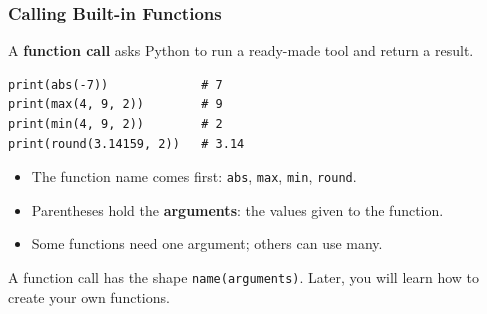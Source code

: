 \documentclass[aspectratio=169,10pt]{beamer}
\newcommand{\keyword}[1]{\textcolor{PrimaryBlue}{\textbf{#1}}}
\newcommand{\myitem}[1]{\item #1\vspace{0.04cm}}
\begin{document}
\begin{frame}[fragile]
\frametitle{Calling Built-in Functions}
\begin{tcolorbox}[lecturebox,title=Key idea]
A \keyword{function call} asks Python to run a ready-made tool and return a result.
\end{tcolorbox}

\begin{lstlisting}[style=pycode]
print(abs(-7))             # 7
print(max(4, 9, 2))        # 9
print(min(4, 9, 2))        # 2
print(round(3.14159, 2))   # 3.14
\end{lstlisting}

\begin{itemize}\setlength\itemsep{0.03cm}
  \myitem{The function name comes first: \texttt{abs}, \texttt{max}, \texttt{min}, \texttt{round}.}
  \myitem{Parentheses hold the \keyword{arguments}: the values given to the function.}
  \myitem{Some functions need one argument; others can use many.}
\end{itemize}

\begin{tcolorbox}[lecturebox,title=Beginner checkpoint]
A function call has the shape \texttt{name(arguments)}. Later, you will learn how to create your own functions.
\end{tcolorbox}
\end{frame}
\end{document}
